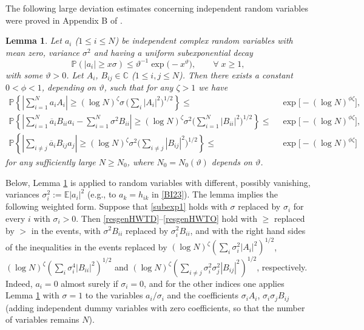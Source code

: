 \documentclass[draft]{article}
\newcommand{\ttau}{\vartheta}
\newcommand{\be}{\begin{equation}}
\newcommand{\ee}{\end{equation}}
\newcommand{\E}{{\mathbb E }}
\renewcommand{\P}{{\mathbb P}}
\newcommand{\C}{{\mathbb C}}
\newtheorem{lemma}[theorem]{Lemma}
\numberwithin{equation}{section}
\numberwithin{theorem}{section}
\numberwithin{definition}{section}
\numberwithin{remark}{section}
\begin{document}
The following  large deviation
estimates concerning independent random variables were proved in 
Appendix B of \cite{EYY}. 

\begin{lemma}\label{generalHWT}
Let $a_i$ ($1\leq i\leq N$) be independent complex random  variables with mean zero, 
variance $\sigma^2$  and having a uniform  subexponential decay 
\be\label{subexp1}
\P(|a_{i}|\geq x \sigma)\leq \ttau^{-1} \exp{\big( - x^\ttau\big)}, \qquad \forall \; x\ge 1,
\ee
with some $\ttau>0$.
Let $A_i$, $B_{ij}\in \C$ ($1\leq i,j\leq N$). 
Then   there exists a constant $0< \phi<1$, depending on $\ttau $,
 such that for any $\zeta > 1$ 
we have
 \begin{align}
\P\left\{\left|\sum_{i=1}^N a_iA_i\right|\geq  (\log N)^{\zeta}
 \sigma \,\Big(\sum_{i}|A_i|^2\Big)^{1/2}\right\}\leq &\; \exp{\big[-(\log N)^{\phi \zeta  } \big]},
\label{resgenHWTD} \\
\P\left\{\left|\sum_{i=1}^N\overline a_iB_{ii}a_i-\sum_{i=1}^N\sigma^2 B_{ii}\right|\geq 
(\log N)^{\zeta} \sigma^2 \Big( \sum_{i=1}^N|B_{ii}|^2\Big)^{1/2}\right\}\leq &\;
  \exp{\big[-(\log N)^{\phi \zeta } \big]},\label{diaglde}\\
\P\left\{\left|\sum_{i\neq j}\overline a_iB_{ij}a_j\right|\geq (\log N)^{\zeta} \sigma^2 
\Big(\sum_{i\ne j} |B_{ij}|^2 \Big)^{1/2}\right\}\leq & \; \exp{\big[-(\log N)^{\phi \zeta } \big]}
 \label{resgenHWTO}
\end{align}  
for any sufficiently large $N\ge N_0$, where $N_0=N_0(\ttau)$ depends on  $\ttau$.
\end{lemma}

\medskip

 Below, Lemma \ref{generalHWT} is applied to random variables with different,
possibly vanishing, variances $\sigma_i^2:=\E|a_i|^2$ (e.g., to $a_k=h_{ik}$ in \eqref{BI23}).
The lemma implies the following weighted form. Suppose that \eqref{subexp1} holds with $\sigma$
replaced by $\sigma_i$ for every $i$ with $\sigma_i>0$. Then \eqref{resgenHWTD}--\eqref{resgenHWTO}
hold with $\ge$ replaced by $>$ in the events, with $\sigma^2B_{ii}$ replaced by $\sigma_i^2B_{ii}$,
and with the right hand sides of the inequalities in the events replaced by
$(\log N)^\zeta(\sum_i\sigma_i^2|A_i|^2)^{1/2}$, $(\log N)^\zeta(\sum_i\sigma_i^4|B_{ii}|^2)^{1/2}$
and $(\log N)^\zeta(\sum_{i\ne j}\sigma_i^2\sigma_j^2|B_{ij}|^2)^{1/2}$, respectively.
Indeed, $a_i=0$ almost surely if $\sigma_i=0$, and for the other indices one applies
Lemma \ref{generalHWT} with $\sigma=1$ to the variables $a_i/\sigma_i$ and the coefficients
$\sigma_iA_i$, $\sigma_i\sigma_jB_{ij}$ (adding independent dummy variables with zero coefficients,
so that the number of variables remains $N$).
\end{document}
